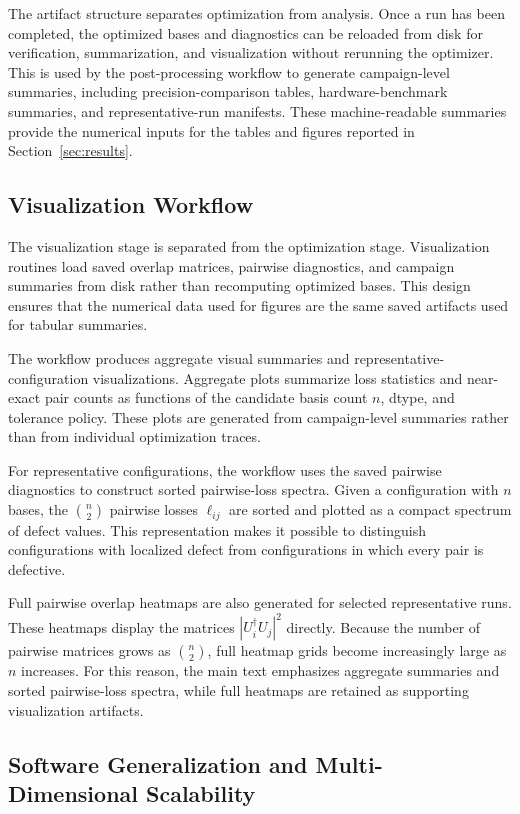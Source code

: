 \documentclass[a4paper,twocolumn,11pt,amsfonts,amssymb]{quantumarticle}
\begin{document}
The artifact structure separates optimization from analysis. Once a run has been completed, the optimized bases and diagnostics can be reloaded from disk for verification, summarization, and visualization without rerunning the optimizer. This is used by the post-processing workflow to generate campaign-level summaries, including precision-comparison tables, hardware-benchmark summaries, and representative-run manifests. These machine-readable summaries provide the numerical inputs for the tables and figures reported in Section~\ref{sec:results}.


\subsection{Visualization Workflow}

The visualization stage is separated from the optimization stage. Visualization routines load saved overlap matrices, pairwise diagnostics, and campaign summaries from disk rather than recomputing optimized bases. This design ensures that the numerical data used for figures are the same saved artifacts used for tabular summaries.

The workflow produces aggregate visual summaries and representative-configuration visualizations. Aggregate plots summarize loss statistics and near-exact pair counts as functions of the candidate basis count \(n\), dtype, and tolerance policy. These plots are generated from campaign-level summaries rather than from individual optimization traces.

For representative configurations, the workflow uses the saved pairwise diagnostics to construct sorted pairwise-loss spectra. Given a configuration with \(n\) bases, the \(\binom{n}{2}\) pairwise losses \(\ell_{ij}\) are sorted and plotted as a compact spectrum of defect values. This representation makes it possible to distinguish configurations with localized defect from configurations in which every pair is defective.

Full pairwise overlap heatmaps are also generated for selected representative runs. These heatmaps display the matrices \( |U_i^\dagger U_j|^2 \) directly. Because the number of pairwise matrices grows as \(\binom{n}{2}\), full heatmap grids become increasingly large as \(n\) increases. For this reason, the main text emphasizes aggregate summaries and sorted pairwise-loss spectra, while full heatmaps are retained as supporting visualization artifacts.

\subsection{Software Generalization and Multi-Dimensional Scalability}
\label{subsec:software-scalability}
\end{document}
